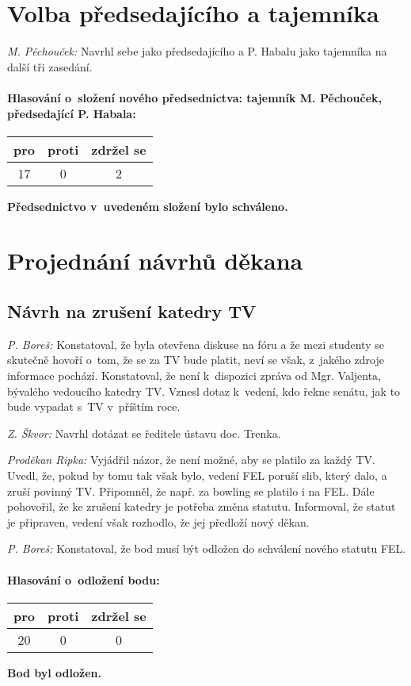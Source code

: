 \documentclass[a4paper,12pt,notitlepage,oneside]{article}
\newcommand{\hlasovani}[3]{\begin{center}
\begin{tabular}{|c|c|c|}\hline
pro& proti & zdržel se \\ \hline
#1 & #2 & #3 \\ \hline
\end{tabular}
\end{center}}
\begin{document}
\newpage\section{Volba předsedajícího a tajemníka}
\textit{M. Pěchouček:} Navrhl sebe jako předsedajícího a P. Habalu jako tajemníka na další tři zasedání.

\paragraph{Hlasování o~složení nového předsednictva: tajemník M. Pěchouček, předsedající P. Habala:}
\hlasovani{17}{0}{2}
\textbf{Předsednictvo v~uvedeném složení bylo schváleno.}


\section{Projednání návrhů děkana}
\subsection{Návrh na zrušení katedry TV}
\textit{P. Boreš:} Konstatoval, že byla otevřena diskuse na fóru a že mezi studenty se skutečně hovoří o~tom, že se za TV bude platit, neví se však, z~jakého zdroje informace pochází. Konstatoval, že není k~dispozici zpráva od Mgr. Valjenta, bývalého vedoucího katedry TV. Vznesl dotaz k~vedení, kdo řekne senátu, jak to bude vypadat s~TV v~příštím roce.

\textit{Z. Škvor:} Navrhl dotázat se ředitele ústavu doc. Trenka.

\textit{Proděkan Ripka:} Vyjádřil názor, že není možné, aby se platilo za každý TV. Uvedl, že, pokud by tomu tak však bylo, vedení FEL poruší slib, který dalo, a zruší povinný TV. Připomněl, že např. za bowling se platilo i na FEL. Dále pohovořil, že ke zrušení katedry je potřeba změna statutu. Informoval, že statut je připraven, vedení však rozhodlo, že jej předloží nový děkan.

\textit{P. Boreš:} Konstatoval, že bod musí být odložen do schválení nového statutu FEL.

\paragraph{Hlasování o~odložení bodu:}
\hlasovani{20}{0}{0}
\textbf{Bod byl odložen.}
\end{document}
